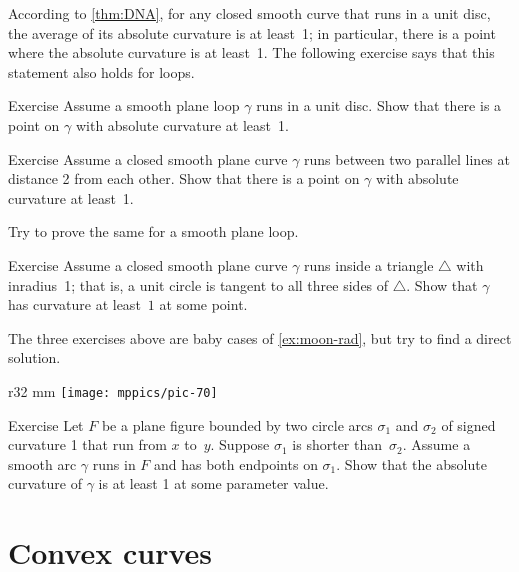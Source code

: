 According to \ref{thm:DNA}, for any closed smooth curve that runs in a unit disc, the average of its absolute curvature is at least~1; in particular, there is a point where the absolute curvature is at least~1.
The following exercise says that this statement also holds for loops.

\begin{thm}{Exercise}\label{ex:in-circle}
Assume a smooth plane loop $\gamma$ runs in a unit disc.
Show that there is a point on $\gamma$ with absolute curvature at least~1.
\end{thm}


\begin{thm}{Exercise}\label{ex:between-parallels-1}
Assume a closed smooth plane curve $\gamma$ runs between two parallel lines at distance 2 from each other.
Show that there is a point on $\gamma$ with absolute curvature at least~1.

Try to prove the same for a smooth plane loop.
\end{thm}

\begin{thm}{Exercise}\label{ex:in-triangle}
Assume a closed smooth plane curve $\gamma$ runs inside a triangle $\triangle$ with inradius~1; that is, a unit circle is tangent to all three sides of $\triangle$. 
Show that $\gamma$ has curvature at least~$1$ at some point.
\end{thm}

The three exercises above are baby cases of \ref{ex:moon-rad}, but try to find a direct solution.

{

\begin{wrapfigure}{r}{32 mm}
\vskip-4mm
\centering
\texttt{[image: mppics/pic-70]}
\vskip0mm
\end{wrapfigure}

\begin{thm}{Exercise}\label{ex:lens}
Let $F$ be a plane figure bounded by two circle arcs $\sigma_1$ and $\sigma_2$ of signed curvature 1 that run from $x$ to~$y$.
Suppose $\sigma_1$ is shorter than~$\sigma_2$.
Assume a smooth arc $\gamma$ runs in $F$ and has both endpoints on $\sigma_1$.
Show that the absolute curvature of $\gamma$ is at least 1 at some parameter value.

\end{thm}

}

\section{Convex curves}

